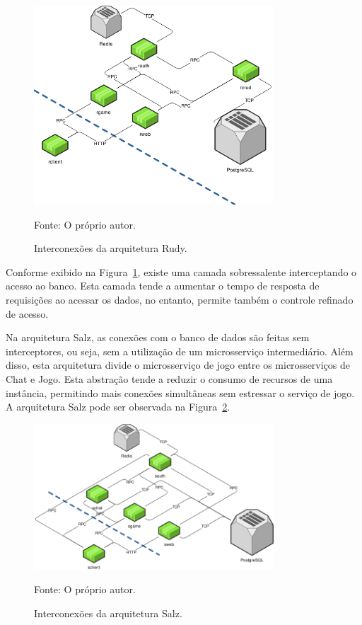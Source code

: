 \begin{figure}[htb!]
  \caption{Interconexões da arquitetura Rudy.}
  \label{fig:interconexao_rudy}
  \includegraphics[width=0.8\textwidth]{figuras/interconexoes/rudy.png}
  \centering

  Fonte: O próprio autor.
\end{figure}



Conforme exibido na Figura~\ref{fig:interconexao_rudy}, existe uma camada sobressalente interceptando o acesso ao banco.
%
Esta camada tende a aumentar o tempo de resposta de requisições ao acessar os dados, no entanto, permite também o controle refinado de acesso.



Na arquitetura Salz, as conexões com o banco de dados são feitas sem interceptores, ou seja, sem a utilização de um microsserviço intermediário.
%
Além disso, esta arquitetura divide o microsserviço de jogo entre os microsserviços de Chat e Jogo.
%
Esta abstração tende a reduzir o consumo de recursos de uma instância, permitindo mais conexões simultâneas sem estressar o serviço de jogo.
%
A arquitetura Salz pode ser observada na Figura~\ref{fig:interconexao_salz}.



\begin{figure}[htb!]
  \caption{Interconexões da arquitetura Salz.}
  \label{fig:interconexao_salz}
  \includegraphics[width=0.8\textwidth]{figuras/interconexoes/salz.png}
  \centering

  Fonte: O próprio autor.
\end{figure}




